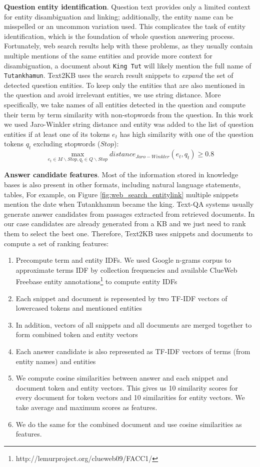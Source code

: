 \textbf{Question entity identification}.
Question text provides only a limited context for entity disambiguation and linking; additionally, the entity name can be misspelled or an uncommon variation used.
This complicates the task of entity identification, which is the foundation of whole question answering process.
Fortunately, web search results help with these problems, as they usually contain multiple mentions of the same entities and provide more context for disambiguation, \eg a document about \texttt{King Tut} will likely mention the full name of \texttt{Tutankhamun}.
Text2KB uses the search result snippets to \textit{expand} the set of detected question entities.
To keep only the entities that are also mentioned in the question and avoid irrelevant entities, we use string distance.
More specifically, we take names of all entities detected in the question and compute their term by term similarity with non-stopwords from the question.
In this work we used Jaro-Winkler string distance and entity was added to the list of question entities if at least one of its tokens $e_t$ has high similarity with one of the question tokens $q_t$ excluding stopwords ($Stop$):
$$\max_{e_t \in M\backslash Stop, q_t \in Q\backslash Stop} distance_{Jaro-Winkler}(e_t, q_t) \geq 0.8$$

\textbf{Answer candidate features}.
Most of the information stored in knowledge bases is also present in other formats, including natural language statements, tables, \etc
For example, on Figure \ref{fig:web_search_entitylink} multiple snippets mention the date when Tutankhamun became the king.
Text-QA systems usually generate answer candidates from passages extracted from retrieved documents.
In our case candidates are already generated from a KB and we just need to rank them to select the best one.
Therefore, Text2KB uses snippets and documents to compute a set of ranking features:

\vspace{-0.2cm}
\begin{enumerate}
\setlength\itemsep{-0.5em}
\item Precompute term and entity IDFs. We used Google n-grams corpus to approximate terms IDF by collection frequencies and available ClueWeb Freebase entity annotations\footnote{http://lemurproject.org/clueweb09/FACC1/} to compute entity IDFs
\item Each snippet and document is represented by two TF-IDF vectors of lowercased tokens and mentioned entities
\item In addition, vectors of all snippets and all documents are merged together to form combined token and entity vectors
\item Each answer candidate is also represented as TF-IDF vectors of terms (from entity names) and entities
\item We compute cosine similarities between answer and each snippet and document token and entity vectors. This gives us 10 similarity scores for every document for token vectors and 10 similarities for entity vectors. We take average and maximum scores as features.
\item We do the same for the combined document and use cosine similarities as features.
\end{enumerate}

